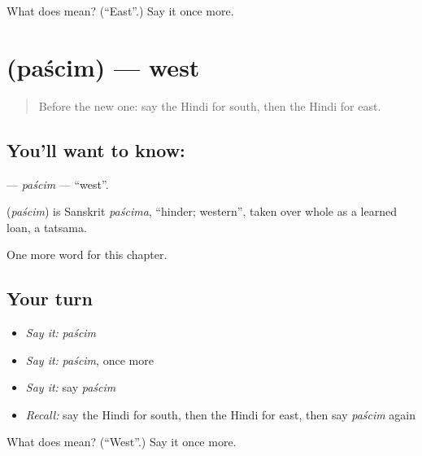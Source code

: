 \begin{tcolorbox}[breakable,colback=teal!4,colframe=teal!35!black,title={Before you move on}]
What does  mean? (\textquotedblleft{}East\textquotedblright{}.) Say it once more.
\end{tcolorbox}
\section[\texorpdfstring{\hi{पश्चिम} (paścim)}{पश्चिम (paścim)}]{ (paścim) — west}

\label{lesson:HI-C233-pascim}



\begin{quote}
Before the new one: say the Hindi for south, then the Hindi for east.
\end{quote}

\subsection*{You'll want to know: }
\textbf{} — \emph{paścim} — \textquotedblleft{}west\textquotedblright{}.

\begin{cousinweb}
\textbf{} (\emph{paścim}) is Sanskrit \emph{paścima}, \textquotedblleft{}hinder; western\textquotedblright{}, taken over whole as a learned loan, a tatsama.
\end{cousinweb}

\begin{grammarlens}[title={What you've built}]
One more word for this chapter.
\end{grammarlens}

\subsection*{Your turn}
\begin{itemize}
\raggedright
  \item \emph{Say it:} \emph{paścim}
  \item \emph{Say it:} \emph{paścim}, once more
  \item \emph{Say it:} say \emph{paścim}
  \item \emph{Recall:} say the Hindi for south, then the Hindi for east, then say \emph{paścim} again
\end{itemize}

\begin{tcolorbox}[breakable,colback=teal!4,colframe=teal!35!black,title={Before you move on}]
What does  mean? (\textquotedblleft{}West\textquotedblright{}.) Say it once more.
\end{tcolorbox}

